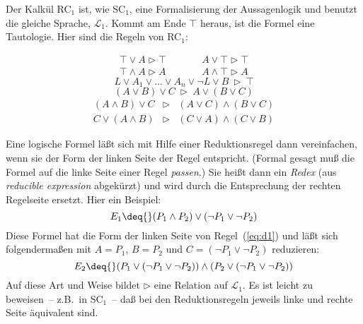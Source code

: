 Der Kalkül RC$_1$ ist, wie SC$_1$, eine Formalisierung der Aussagenlogik und
benutzt die gleiche Sprache, $\mathcal{L}_1$.  Kommt am Ende $\top$ heraus, ist
die Formel eine Tautologie.  Hier sind die Regeln von RC$_1$:
%
\begin{definition}
\begin{eqnarray}
    \top\vee A\triangleright \top &\qquad& A\vee\top \triangleright\top\label{eq:e1}\\%
    \top\wedge A\triangleright A &\qquad& A\wedge\top\triangleright A\label{eq:e2}%
\end{eqnarray}
\begin{equation}
  L\vee A_1\vee\ldots \vee A_n\vee\neg L\vee B\:\triangleright\: \top\label{eq:t}%
\end{equation}
\begin{equation}
  (A\vee B)\vee C\:\triangleright\: A\vee(B\vee C)\label{eq:a}%
\end{equation}
\begin{eqnarray}
  (A\wedge B)\vee C&\triangleright& (A\vee C)\wedge (B\vee C)\label{eq:d1}\\%
  C\vee(A\wedge B)&\triangleright& (C\vee A)\wedge (C\vee B)\label{eq:d2}%
\end{eqnarray}
\end{definition}
%
Eine logische Formel läßt sich
mit Hilfe einer Reduktionsregel dann vereinfachen, wenn sie der Form
der linken Seite der Regel entspricht.  (Formal gesagt muß die Formel
auf die linke Seite einer Regel \textit{passen}.)  
Sie heißt dann ein \emph{Redex} (aus
\emph{reducible expression} abgekürzt) und wird durch die
Entsprechung der rechten Regelseite ersetzt.  Hier ein Beispiel:
%
\begin{displaymath}
  E_1 \deq{} (P_1\wedge P_2)\vee (\neg
    P_1\vee \neg P_2)
\end{displaymath}
%
Diese Formel hat die Form der linken Seite von Regel~(\ref{eq:d1}) und läßt
sich folgendermaßen mit $A=P_1$,
$B=P_2$ und $C=(\neg P_1\vee\neg{P_2})$
reduzieren:
%
\begin{displaymath}
  E_2 \deq{} (P_1\vee(\neg P_1\vee\neg{P_2}))\wedge 
  (P_2\vee(\neg P_1\vee\neg{P_2}))
\end{displaymath}
%
Auf
diese Art und Weise bildet $\triangleright$ eine Relation auf
$\mathcal{L}_1$.
Es ist leicht zu beweisen~-- z.B.\ in SC$_1$~-- daß bei den
Reduktionsregeln jeweils linke und rechte Seite äquivalent sind.

